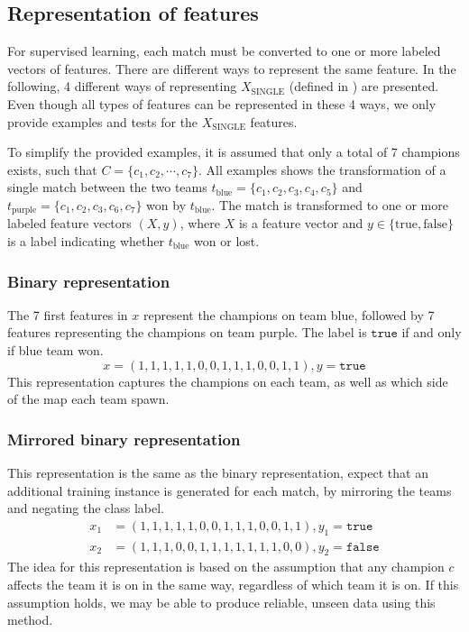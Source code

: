 \subsection{Representation of features}
\label{sec:representationoffeatures}
For supervised learning, each match must be converted to one or more labeled vectors of features.
There are different ways to represent the same feature. In the following,
4 different ways of representing $X_\text{SINGLE}$ (defined in ) are presented.
Even though all types of features can be represented in these 4 ways, we only provide examples and tests for the $X_\text{SINGLE}$ features.

To simplify the provided examples, it is assumed that only a total of 7 champions exists, such that $C = \{c_1, c_2, \cdots, c_7\}$.
All examples shows the transformation of a single match between the two teams $t_\text{blue} = \{c_1,c_2,c_3,c_4,c_5\}$ and $t_\text{purple} = \{c_1,c_2,c_3,c_6,c_7\}$ won by $t_\text{blue}$. The match is transformed to one or more labeled feature vectors $(X, y)$, where $X$ is a feature vector and $y \in \{\text{true}, \text{false}\}$ is a label indicating whether $t_\text{blue}$ won or lost.

\subsubsection{Binary representation}
The 7 first features in $x$ represent the champions on team blue, followed by 7 features representing the champions on team purple. The label is $\texttt{true}$ if and only if blue team won.
\[ x = (1,1,1,1,1,0,0,1,1,1,0,0,1,1), y = \texttt{true} \]
This representation captures the champions on each team, as well as which side of the map each team spawn.

\subsubsection{Mirrored binary representation}
This representation is the same as the binary representation, expect that an additional training instance is generated for each match, by mirroring the teams and negating the class label.
\begin{align*}
  x_1 &= (1,1,1,1,1,0,0,1,1,1,0,0,1,1), y_1 = \texttt{true}\\
  x_2 &= (1,1,1,0,0,1,1,1,1,1,1,1,0,0), y_2 = \texttt{false}
\end{align*}
The idea for this representation is based on the assumption that any champion $c$ affects the team it is on in the same way, regardless of which team it is on.
If this assumption holds, we may be able to produce reliable, unseen data using this method.

